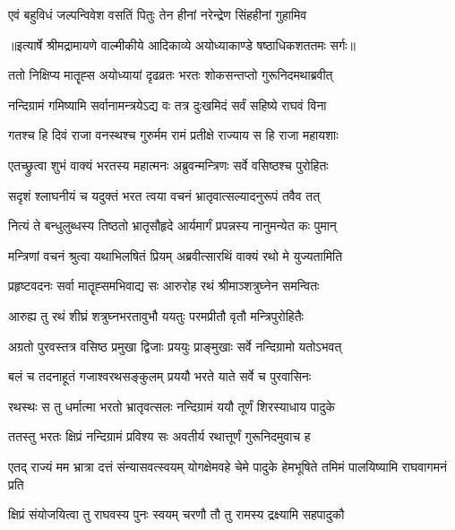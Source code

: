 \twolineshloka
{एवं बहुविधं जल्पन्विवेश वसतिं पितुः}
{तेन हीनां नरेन्द्रेण सिंहहीनां गुहामिव} %


{॥इत्यार्षे श्रीमद्रामायणे वाल्मीकीये आदिकाव्ये अयोध्याकाण्डे षष्ठाधिकशततमः सर्गः॥}


\twolineshloka
{ततो निक्षिप्य मातॄह्स अयोध्यायां दृढव्रतः}
{भरतः शोकसन्तप्तो गुरूनिदमथाब्रवीत्} %

\twolineshloka
{नन्दिग्रामं गमिष्यामि सर्वानामन्त्रयेऽद्य वः}
{तत्र दुःखमिदं सर्वं सहिष्ये राघवं विना} %

\twolineshloka
{गतश्च हि दिवं राजा वनस्थश्च गुरुर्मम}
{रामं प्रतीक्षे राज्याय स हि राजा महायशाः} %

\twolineshloka
{एतच्छ्रुत्वा शुभं वाक्यं भरतस्य महात्मनः}
{अब्रुवन्मन्त्रिणः सर्वे वसिष्ठश्च पुरोहितः} %

\twolineshloka
{सदृशं श्लाघनीयं च यदुक्तं भरत त्वया}
{वचनं भ्रातृवात्सल्यादनुरूपं तवैव तत्} %

\twolineshloka
{नित्यं ते बन्धुलुब्धस्य तिष्ठतो भ्रातृसौहृदे}
{आर्यमार्गं प्रपन्नस्य नानुमन्येत कः पुमान्} %

\twolineshloka
{मन्त्रिणां वचनं श्रुत्वा यथाभिलषितं प्रियम्}
{अब्रवीत्सारथिं वाक्यं रथो मे युज्यतामिति} %

\twolineshloka
{प्रहृष्टवदनः सर्वा मातॄह्समभिवाद्य सः}
{आरुरोह रथं श्रीमाञ्शत्रुघ्नेन समन्वितः} %

\twolineshloka
{आरुह्य तु रथं शीघ्रं शत्रुघ्नभरतावुभौ}
{ययतुः परमप्रीतौ वृतौ मन्त्रिपुरोहितैः} %

\twolineshloka
{अग्रतो पुरवस्तत्र वसिष्ठ प्रमुखा द्विजाः}
{प्रययुः प्राङ्मुखाः सर्वे नन्दिग्रामो यतोऽभवत्} %

\twolineshloka
{बलं च तदनाहूतं गजाश्वरथसङ्कुलम्}
{प्रययौ भरते याते सर्वे च पुरवासिनः} %

\twolineshloka
{रथस्थः स तु धर्मात्मा भरतो भ्रातृवत्सलः}
{नन्दिग्रामं ययौ तूर्णं शिरस्याधाय पादुके} %

\twolineshloka
{ततस्तु भरतः क्षिप्रं नन्दिग्रामं प्रविश्य सः}
{अवतीर्य रथात्तूर्णं गुरूनिदमुवाच ह} %

\threelineshloka
{एतद् राज्यं मम भ्रात्रा दत्तं संन्यासवत्स्वयम्}
{योगक्षेमवहे चेमे पादुके हेमभूषिते}
{तमिमं पालयिष्यामि राघवागमनं प्रति} %

\twolineshloka
{क्षिप्रं संयोजयित्वा तु राघवस्य पुनः स्वयम्}
{चरणौ तौ तु रामस्य द्रक्ष्यामि सहपादुकौ} %

